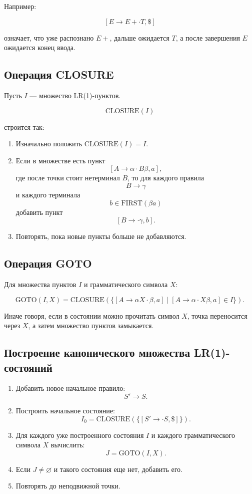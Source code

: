 \documentclass[12pt,a4paper]{article}
\begin{document}
Например:

\[
[E \to E + \cdot T, \$]
\]

означает, что уже распознано $E+$, дальше ожидается $T$, а после завершения $E$ ожидается конец ввода.

\subsection{Операция CLOSURE}

Пусть $I$ --- множество LR(1)-пунктов.

\[
\mathrm{CLOSURE}(I)
\]

строится так:

\begin{enumerate}
    \item Изначально положить $\mathrm{CLOSURE}(I)=I$.
    \item Если в множестве есть пункт
    \[
    [A \to \alpha \cdot B\beta, a],
    \]
    где после точки стоит нетерминал $B$, то для каждого правила
    \[
    B \to \gamma
    \]
    и каждого терминала
    \[
    b \in \mathrm{FIRST}(\beta a)
    \]
    добавить пункт
    \[
    [B \to \cdot \gamma, b].
    \]
    \item Повторять, пока новые пункты больше не добавляются.
\end{enumerate}

\subsection{Операция GOTO}

Для множества пунктов $I$ и грамматического символа $X$:

\[
\mathrm{GOTO}(I,X)
=
\mathrm{CLOSURE}
\left(
\{[A\to \alpha X \cdot \beta,a]
\mid
[A\to \alpha \cdot X\beta,a]\in I\}
\right).
\]

Иначе говоря, если в состоянии можно прочитать символ $X$, точка переносится через $X$, а затем множество пунктов замыкается.

\subsection{Построение канонического множества LR(1)-состояний}

\begin{enumerate}
    \item Добавить новое начальное правило:
    \[
    S' \to S.
    \]
    \item Построить начальное состояние:
    \[
    I_0 = \mathrm{CLOSURE}(\{[S'\to \cdot S,\$]\}).
    \]
    \item Для каждого уже построенного состояния $I$ и каждого грамматического символа $X$ вычислить:
    \[
    J=\mathrm{GOTO}(I,X).
    \]
    \item Если $J\ne\varnothing$ и такого состояния еще нет, добавить его.
    \item Повторять до неподвижной точки.
\end{enumerate}
\end{document}

